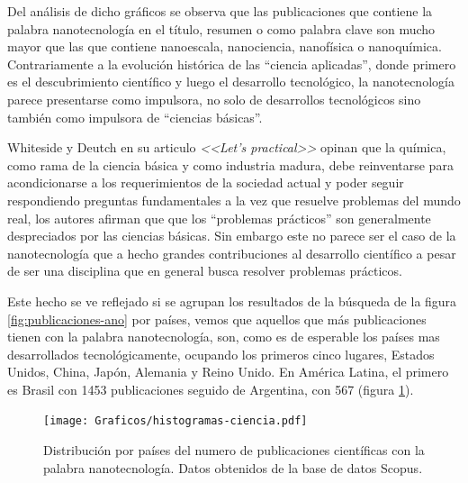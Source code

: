 	Del análisis de dicho gráficos se observa que las publicaciones que contiene la palabra nanotecnología en el título, resumen o como palabra clave son mucho mayor que las que contiene nanoescala, nanociencia, nanofísica o nanoquímica. Contrariamente a la evolución histórica de las ``ciencia aplicadas'', donde primero es el descubrimiento científico y luego el desarrollo tecnológico, la nanotecnología parece presentarse como impulsora, no solo de desarrollos tecnológicos sino también como impulsora de ``ciencias básicas''.

	Whiteside y Deutch en su articulo \textit{<<Let's practical>>} opinan que la química, como rama de la ciencia básica y como industria madura, debe reinventarse para acondicionarse a los requerimientos de la sociedad actual y poder seguir respondiendo preguntas fundamentales a la vez que resuelve problemas del mundo real, los autores afirman que que los ``problemas prácticos'' son generalmente despreciados por las ciencias básicas. \cite{Burdass2010} Sin embargo este no parece ser el caso de la nanotecnología que a hecho grandes contribuciones al desarrollo científico a pesar de ser una disciplina que en general busca resolver problemas prácticos.
	
	Este hecho se ve reflejado si se agrupan los resultados de la búsqueda de la figura \ref{fig:publicaciones-ano} por países, vemos que aquellos que más publicaciones tienen con la palabra nanotecnología, son, como es de esperable los países mas desarrollados tecnológicamente, ocupando los primeros cinco lugares, Estados Unidos, China, Japón, Alemania y Reino Unido. En América Latina, el primero es Brasil con 1453 publicaciones seguido de Argentina, con 567 (figura \ref{fig:paises}).

			\begin{figure}[ht!]
 				\begin{center}
 				\texttt{[image: Graficos/histogramas-ciencia.pdf]}
 				\caption[Nanotecnología por países]{Distribución por países del numero de publicaciones científicas con la palabra nanotecnología. Datos obtenidos de la base de datos Scopus.}
 				\label{fig:paises}
 		    	\end{center}
 		    	\end{figure}

